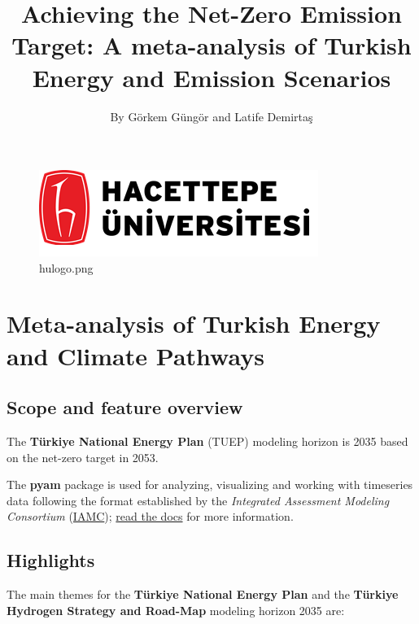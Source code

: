\documentclass[11pt]{article}
\title{Achieving the Net-Zero Emission Target: A meta-analysis of Turkish Energy and Emission Scenarios}
\author{By Görkem Güngör and Latife
Demirtaş}\label{by-guxf6rkem-guxfcnguxf6r-and-latife-demirtaux15f}}
\begin{document}
    
    \maketitle
    
    

    
    \begin{figure}
\centering
\includegraphics{hulogo.png}
\caption{hulogo.png}
\end{figure}

\hypertarget{meta-analysis-of-turkish-energy-and-climate-pathways}{%
\section{\texorpdfstring{ Meta-analysis of Turkish Energy and Climate
Pathways
}{ Meta-analysis of Turkish Energy and Climate Pathways }}\label{meta-analysis-of-turkish-energy-and-climate-pathways}}

    \hypertarget{scope-and-feature-overview}{%
\subsection{Scope and feature
overview}\label{scope-and-feature-overview}}

The \textbf{Türkiye National Energy Plan} (TUEP) modeling horizon is
2035 based on the net-zero target in 2053.

The \textbf{pyam} package is used for analyzing, visualizing and working
with timeseries data following the format established by the
\emph{Integrated Assessment Modeling Consortium}
(\href{https://www.iamconsortium.org}{IAMC});
\href{https://pyam-iamc.readthedocs.io/en/stable/data.html}{read the
docs} for more information.

    \hypertarget{highlights}{%
\subsection{Highlights}\label{highlights}}

The main themes for the \textbf{Türkiye National Energy Plan} and the
\textbf{Türkiye Hydrogen Strategy and Road-Map} modeling horizon 2035
are:
\end{document}
